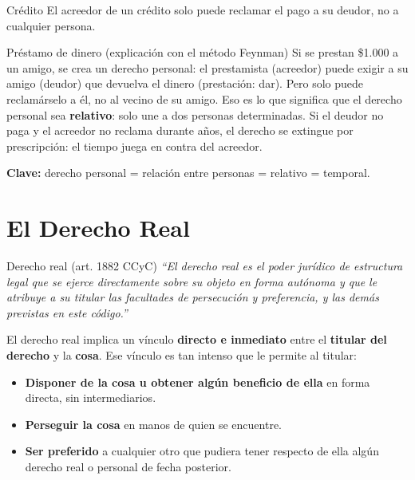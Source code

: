 \documentclass[12pt,oneside]{book}
\begin{document}
\begin{example}{Cr\'edito}
El acreedor de un cr\'edito solo puede reclamar el pago a su deudor, no a cualquier persona.
\end{example}

\begin{example}{Pr\'estamo de dinero (explicaci\'on con el m\'etodo Feynman)}
Si se prestan \$1.000 a un amigo, se crea un derecho personal: el prestamista (acreedor) puede exigir a su amigo (deudor) que devuelva el dinero (prestaci\'on: dar). Pero solo puede reclam\'arselo a \'el, no al vecino de su amigo. Eso es lo que significa que el derecho personal sea \textbf{relativo}: solo une a dos personas determinadas. Si el deudor no paga y el acreedor no reclama durante a\~nos, el derecho se extingue por prescripci\'on: el tiempo juega en contra del acreedor.

\textbf{Clave:} derecho personal = relaci\'on entre personas = relativo = temporal.
\end{example}

\section{El Derecho Real}

\begin{definition}{Derecho real (art. 1882 CCyC)}
\textit{``El derecho real es el poder jur\'idico de estructura legal que se ejerce directamente sobre su objeto en forma aut\'onoma y que le atribuye a su titular las facultades de persecuci\'on y preferencia, y las dem\'as previstas en este c\'odigo.''}
\end{definition}

El derecho real implica un v\'inculo \textbf{directo e inmediato} entre el \textbf{titular del derecho} y la \textbf{cosa}. Ese v\'inculo es tan intenso que le permite al titular:

\begin{itemize}
    \item \textbf{Disponer de la cosa u obtener alg\'un beneficio de ella} en forma directa, sin intermediarios.
    \item \textbf{Perseguir la cosa} en manos de quien se encuentre.
    \item \textbf{Ser preferido} a cualquier otro que pudiera tener respecto de ella alg\'un derecho real o personal de fecha posterior.
\end{itemize}

\end{document}
